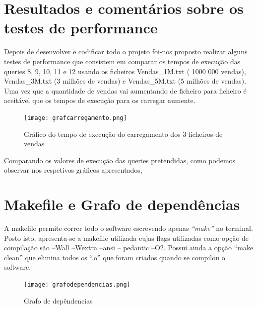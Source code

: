 \chapter{Resultados e comentários sobre os testes de performance}
Depois de desenvolver e codificar todo o projeto foi-nos proposto realizar alguns testes de performance que consistem em comparar os tempos de execução das queries 8, 9, 10, 11 e 12 usando os ficheiros Vendas\_1M.txt ( 1000 000 vendas), Vendas\_3M.txt (3 milhões de vendas) e Vendas\_5M.txt (5 milhões de vendas).
Uma vez que a quantidade de vendas vai aumentando de ficheiro para ficheiro é aceitável que os tempos de execução para os carregar aumente.


\begin{figure}[h!]
	\centering
	\texttt{[image: grafcarregamento.png]}  
	\caption{Gráfico do tempo de execução do carregamento dos 3 ficheiros de vendas}  
\end{figure}

Comparando os valores de execução das queries pretendidas, como podemos observar nos respetivos gráficos apresentados,




\chapter{Makefile e Grafo de dependências}
A makefile permite correr todo o software escrevendo apenas \textit{“make”} no terminal. Posto isto, apresenta-se a makefile utilizada cujas flags utilizadas como opção de compilação são –Wall –Wextra –ansi – pedantic –O2.
Possui ainda a opção “make clean” que elimina todos os “.o” que foram criados quando se compilou o software.

\begin{figure}[h!]
	\centering
	\texttt{[image: grafodependencias.png]}  
	\caption{Grafo de depêndencias}  
\end{figure}


